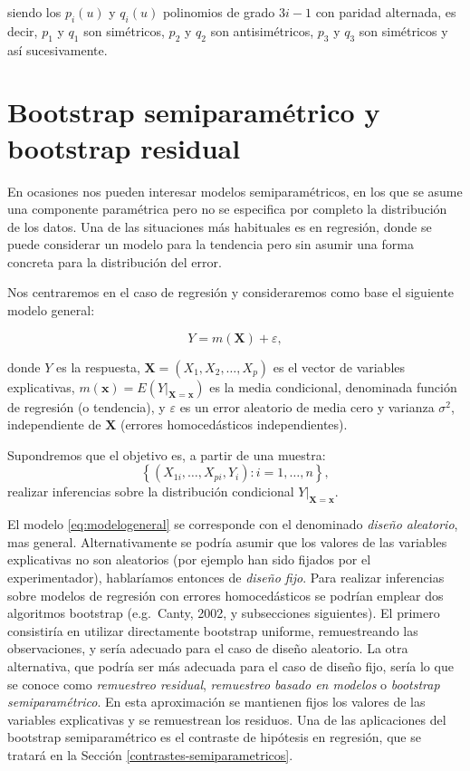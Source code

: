 \documentclass[]{book}
\theoremstyle{break}
\theoremstyle{definition}
\theoremstyle{definition}
\theoremstyle{definition}
\theoremstyle{remark}
\begin{document}
siendo los \(p_i\left( u \right)\) y \(q_i\left( u \right)\) polinomios
de grado \(3i-1\) con paridad alternada, es decir, \(p_1\) y \(q_1\) son
simétricos, \(p_2\) y \(q_2\) son antisimétricos, \(p_3\) y \(q_3\) son
simétricos y así sucesivamente.

\section{Bootstrap semiparamétrico y bootstrap residual}\label{boot-reg}

En ocasiones nos pueden interesar modelos semiparamétricos, en los que
se asume una componente paramétrica pero no se especifica por completo
la distribución de los datos. Una de las situaciones más habituales es
en regresión, donde se puede considerar un modelo para la tendencia pero
sin asumir una forma concreta para la distribución del error.

Nos centraremos en el caso de regresión y consideraremos como base el
siguiente modelo general:

\begin{equation} 
  Y = m(\mathbf{X}) + \varepsilon,
  \label{eq:modelogeneral}
\end{equation}

donde \(Y\) es la respuesta, \(\mathbf{X}=(X_1, X_2, \ldots, X_p)\) es
el vector de variables explicativas,
\(m(\mathbf{x}) = E\left( \left. Y\right\vert_{\mathbf{X}=\mathbf{x}} \right)\)
es la media condicional, denominada función de regresión (o tendencia),
y \(\varepsilon\) es un error aleatorio de media cero y varianza
\(\sigma^2\), independiente de \(\mathbf{X}\) (errores homocedásticos
independientes).

Supondremos que el objetivo es, a partir de una muestra:
\[\left\{ \left( X_{1i}, \ldots, X_{pi}, Y_{i} \right)  : i = 1, \ldots, n \right\},\]
realizar inferencias sobre la distribución condicional
\(\left.Y \right\vert_{\mathbf{X}=\mathbf{x}}\).

El modelo \eqref{eq:modelogeneral} se corresponde con el denominado
\emph{diseño aleatorio}, mas general. Alternativamente se podría asumir
que los valores de las variables explicativas no son aleatorios (por
ejemplo han sido fijados por el experimentador), hablaríamos entonces de
\emph{diseño fijo}. Para realizar inferencias sobre modelos de regresión
con errores homocedásticos se podrían emplear dos algoritmos bootstrap
(e.g.~Canty, 2002, y subsecciones siguientes). El primero consistiría en
utilizar directamente bootstrap uniforme, remuestreando las
observaciones, y sería adecuado para el caso de diseño aleatorio. La
otra alternativa, que podría ser más adecuada para el caso de diseño
fijo, sería lo que se conoce como \emph{remuestreo residual},
\emph{remuestreo basado en modelos} o \emph{bootstrap semiparamétrico}.
En esta aproximación se mantienen fijos los valores de las variables
explicativas y se remuestrean los residuos. Una de las aplicaciones del
bootstrap semiparamétrico es el contraste de hipótesis en regresión, que
se tratará en la Sección \ref{contrastes-semiparametricos}.
\end{document}

